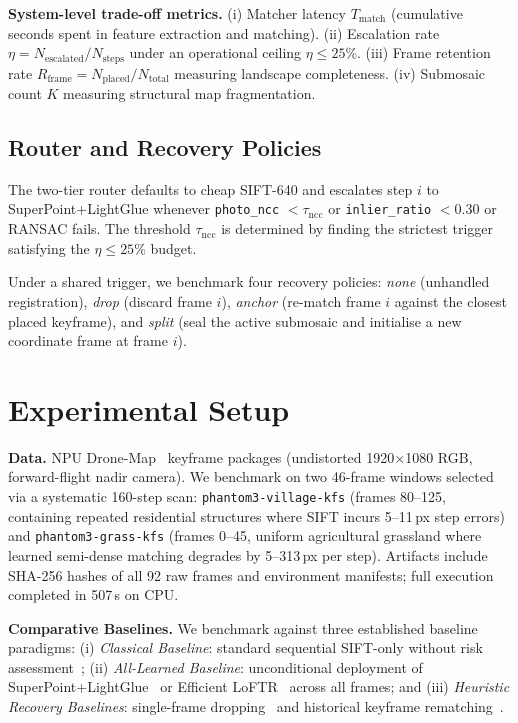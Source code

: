 \documentclass[conference]{IEEEtran}
\begin{document}
\textbf{System-level trade-off metrics.} (i) Matcher latency $T_{\mathrm{match}}$ (cumulative seconds spent
in feature extraction and matching). (ii) Escalation rate $\eta = N_{\mathrm{escalated}} / N_{\mathrm{steps}}$
under an operational ceiling $\eta \le 25\%$. (iii) Frame retention rate
$R_{\mathrm{frame}} = N_{\mathrm{placed}} / N_{\mathrm{total}}$ measuring landscape completeness.
(iv) Submosaic count $K$ measuring structural map fragmentation.

\subsection{Router and Recovery Policies}
The two-tier router defaults to cheap SIFT-640 and escalates step $i$ to SuperPoint+LightGlue
whenever \texttt{photo\_ncc} $< \tau_{\mathrm{ncc}}$ or \texttt{inlier\_ratio} $< 0.30$ or RANSAC fails.
The threshold $\tau_{\mathrm{ncc}}$ is determined by finding the strictest trigger satisfying the
$\eta \le 25\%$ budget.

Under a shared trigger, we benchmark four recovery policies: \emph{none} (unhandled registration),
\emph{drop} (discard frame $i$), \emph{anchor} (re-match frame $i$ against the closest placed keyframe),
and \emph{split} (seal the active submosaic and initialise a new coordinate frame at frame $i$).

\section{Experimental Setup}
\textbf{Data.} NPU Drone-Map~\cite{map2dfusion} keyframe packages (undistorted 1920$\times$1080 RGB,
forward-flight nadir camera). We benchmark on two 46-frame windows selected via a systematic 160-step
scan: \texttt{phantom3-village-kfs} (frames 80--125, containing repeated residential structures where SIFT
incurs 5--11\,px step errors) and \texttt{phantom3-grass-kfs} (frames 0--45, uniform agricultural grassland
where learned semi-dense matching degrades by 5--313\,px per step). Artifacts include SHA-256 hashes of all
92 raw frames and environment manifests; full execution completed in 507\,s on CPU.

\textbf{Comparative Baselines.} We benchmark against three established baseline paradigms:
(i) \emph{Classical Baseline}: standard sequential SIFT-only without risk assessment~\cite{hwang2026,map2dfusion};
(ii) \emph{All-Learned Baseline}: unconditional deployment of SuperPoint+LightGlue~\cite{kim2025} or
Efficient LoFTR~\cite{wang2024} across all frames; and (iii) \emph{Heuristic Recovery Baselines}: single-frame
dropping~\cite{hwang2026} and historical keyframe rematching~\cite{li2023}.
\end{document}
